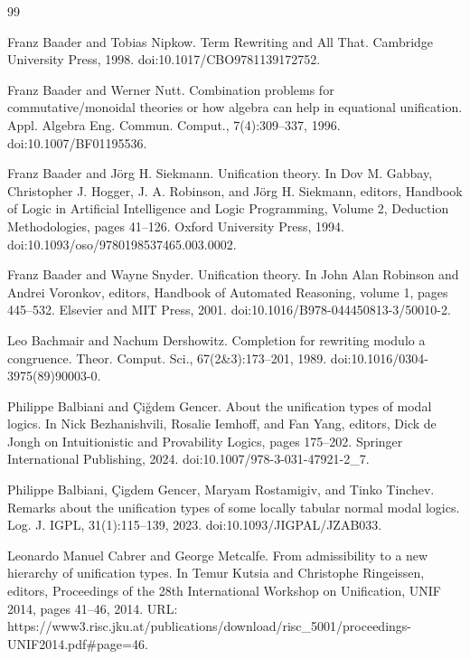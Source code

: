 \documentclass[10pt,a4paper]{amsart}
\begin{document}
\begin{thebibliography}{99}
\par\noindent  [16]  Franz Baader and Tobias Nipkow.  Term Rewriting and All That.  Cambridge University Press, 1998.  doi:10.1017/CBO9781139172752.  
 
\par\noindent  [17]  Franz Baader and Werner Nutt.  Combination problems for commutative/monoidal theories or how algebra can help in equational unification.  Appl. Algebra Eng. Commun. Comput., 7(4):309–337, 1996.  doi:10.1007/BF01195536.  
 
\par\noindent  [18]  Franz Baader and Jörg H. Siekmann.  Unification theory.  In Dov M. Gabbay, Christopher J. Hogger, J. A. Robinson, and Jörg H. Siekmann, editors, Handbook of Logic in Artificial Intelligence and Logic Programming, Volume 2, Deduction Methodologies, pages 41–126. Oxford University Press, 1994.  doi:10.1093/oso/9780198537465.003.0002.  
 
\par\noindent  [19]  Franz Baader and Wayne Snyder.  Unification theory.  In John Alan Robinson and Andrei Voronkov, editors, Handbook of Automated Reasoning, volume 1, pages 445–532. Elsevier and MIT Press, 2001.  doi:10.1016/B978-044450813-3/50010-2.  
 
\par\noindent  [20]  Leo Bachmair and Nachum Dershowitz.  Completion for rewriting modulo a congruence.  Theor. Comput. Sci., 67(2\&3):173–201, 1989.  doi:10.1016/0304-3975(89)90003-0.  
 
\par\noindent  [21]  Philippe Balbiani and Çiğdem Gencer.  About the unification types of modal logics.  In Nick Bezhanishvili, Rosalie Iemhoff, and Fan Yang, editors, Dick de Jongh on Intuitionistic and Provability Logics, pages 175–202. Springer International Publishing, 2024.  doi:10.1007/978-3-031-47921-2\_7.  
 
\par\noindent  [22]  Philippe Balbiani, Çigdem Gencer, Maryam Rostamigiv, and Tinko Tinchev.  Remarks about the unification types of some locally tabular normal modal logics.  Log. J. IGPL, 31(1):115–139, 2023.  doi:10.1093/JIGPAL/JZAB033.  
 
\par\noindent  [23]  Leonardo Manuel Cabrer and George Metcalfe.  From admissibility to a new hierarchy of unification types.  In Temur Kutsia and Christophe Ringeissen, editors, Proceedings of the 28th International Workshop on Unification, UNIF 2014, pages 41–46, 2014.  URL: https://www3.risc.jku.at/publications/download/risc\_5001/proceedings-UNIF2014.pdf\#page=46.  
 

\end{thebibliography}
\end{document}
